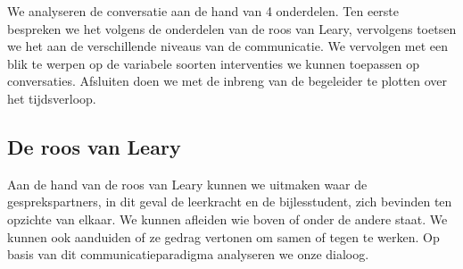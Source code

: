\documentclass[a4paper,12pt]{article}
\theoremstyle{definition}
\begin{document}
We analyseren de conversatie aan de hand van 4 onderdelen. Ten eerste bespreken we het volgens 
de onderdelen van de roos van Leary, vervolgens toetsen we het aan de verschillende niveaus van de 
communicatie. We vervolgen met een blik te werpen op de variabele soorten interventies we kunnen 
toepassen op conversaties. Afsluiten doen we met de inbreng van de begeleider te 
plotten over het tijdsverloop.
\newpage
\subsection{De roos van Leary}
Aan de hand van de roos van Leary kunnen we uitmaken waar de gesprekspartners, 
in dit geval de leerkracht en de bijlesstudent, zich bevinden ten opzichte van 
elkaar. We kunnen afleiden wie boven of onder de andere staat. We kunnen ook aanduiden of ze 
gedrag vertonen om samen of tegen te werken. Op basis van dit 
communicatieparadigma analyseren we onze dialoog.\\
\end{document}
